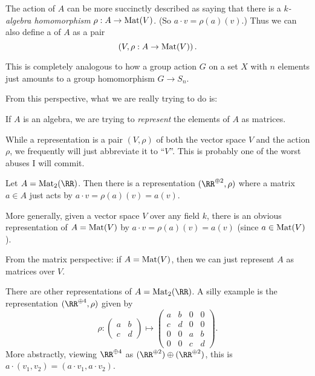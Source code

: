\documentclass[11pt]{scrreprt}
\begin{document}
\begin{definition}
	The action of $A$ can be more succinctly described as saying
	that there is a \emph{$k$-algebra homomorphism} $\rho : A \to \mathrm{Mat}(V)$.
	(So $a \cdot v = \rho(a)(v)$.)
	Thus we can also define a  of $A$ as a pair
	\[ \left( V, \rho : A \to \mathrm{Mat}(V) \right). \]
\end{definition}
\begin{remark}
	This is completely analogous to how a group action $G$ on a set $X$
	with $n$ elements just amounts to a group homomorphism $G \to S_n$.
\end{remark}
From this perspective, what we are really trying to do is:
\begin{moral}
	If $A$ is an algebra,
	we are trying to \emph{represent}
	the elements of $A$ as matrices.
\end{moral}

\begin{abuse}
	While a representation is a pair $(V, \rho)$
	of both the vector space $V$ and the action $\rho$,
	we frequently will just abbreviate it to ``$V$''.
	This is probably one of the worst abuses I will commit.
\end{abuse}

\begin{example}
	\listhack
	\begin{enumerate}[(a)]
		\ii Let $A = \Mat_2(\RR)$.
		Then there is a representation $(\RR^{\oplus 2}, \rho)$
		where a matrix $a \in A$ just acts by $a \cdot v = \rho(a)(v) = a(v)$.

		\ii More generally, given a vector space $V$ over any field $k$,
		there is an obvious representation of $A = \mathrm{Mat}(V)$
		by $a \cdot v = \rho(a)(v) = a(v)$ (since $a \in \mathrm{Mat}(V)$).

		From the matrix perspective: if $A = \mathrm{Mat}(V)$,
		then we can just represent $A$ as matrices over $V$.

		\ii There are other representations of $A = \Mat_2(\RR)$.
		A silly example is the representation $(\RR^{\oplus 4}, \rho)$ given by
		\[
			\rho : 
			\begin{pmatrix} a & b \\ c & d \end{pmatrix} 
			\mapsto
			\begin{pmatrix} a & b & 0 & 0 \\ c & d & 0 & 0 \\
				0 & 0 & a & b \\ 0 & 0 & c & d \end{pmatrix} .
		\]
		More abstractly, viewing $\RR^{\oplus 4}$ as
		$(\RR^{\oplus 2}) \oplus (\RR^{\oplus 2})$,
		this is $a \cdot (v_1,v_2) = (a \cdot v_1, a \cdot v_2)$.
	\end{enumerate}
\end{example}
\end{document}
